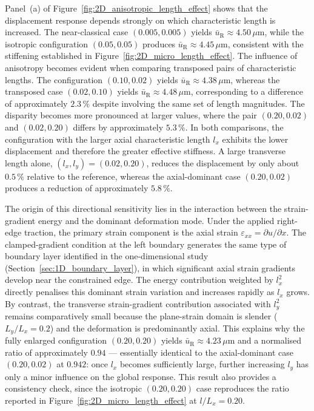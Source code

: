 \documentclass[final,3p,times,fleqn]{elsarticle}
\begin{document}
Panel~(a) of Figure~\ref{fig:2D_anisotropic_length_effect} shows that
the displacement response depends strongly on which characteristic
length is increased.
The near-classical case $(0.005,0.005)$ yields
$\bar{u}_{\mathrm{R}}\approx 4.50\,\mu\mathrm{m}$, while the isotropic
configuration $(0.05,0.05)$ produces
$\bar{u}_{\mathrm{R}}\approx 4.45\,\mu\mathrm{m}$, consistent with the
stiffening established in
Figure~\ref{fig:2D_micro_length_effect}.
The influence of anisotropy becomes evident when comparing transposed
pairs of characteristic lengths.
The configuration $(0.10,0.02)$ yields
$\bar{u}_{\mathrm{R}}\approx 4.38\,\mu\mathrm{m}$, whereas the
transposed case $(0.02,0.10)$ yields
$\bar{u}_{\mathrm{R}}\approx 4.48\,\mu\mathrm{m}$, corresponding to a
difference of approximately $2.3\,\%$ despite involving the same set
of length magnitudes.
The disparity becomes more pronounced at larger values, where the
pair $(0.20,0.02)$ and $(0.02,0.20)$ differs by approximately
$5.3\,\%$.
In both comparisons, the configuration with the larger axial
characteristic length $l_{x}$ exhibits the lower displacement and
therefore the greater effective stiffness.
A large transverse length alone, $(l_{x},l_{y})=(0.02,0.20)$, reduces
the displacement by only about $0.5\,\%$ relative to the reference,
whereas the axial-dominant case $(0.20,0.02)$ produces a reduction of
approximately $5.8\,\%$.

The origin of this directional sensitivity lies in the interaction
between the strain-gradient energy and the dominant deformation mode.
Under the applied right-edge traction, the primary strain component is
the axial strain $\varepsilon_{xx}=\partial u/\partial x$.
The clamped-gradient condition at the left boundary generates the same
type of boundary layer identified in the one-dimensional study
(Section~\ref{sec:1D_boundary_layer}), in which significant axial
strain gradients develop near the constrained edge.
The energy contribution weighted by $l_{x}^{2}$ directly penalises this
dominant strain variation and increases rapidly as $l_{x}$ grows.
By contrast, the transverse strain-gradient contribution associated
with $l_{y}^{2}$ remains comparatively small because the plane-strain domain is
slender ($L_{y}/L_{x}=0.2$) and the deformation is predominantly
axial.
This explains why the fully enlarged configuration $(0.20,0.20)$
yields $\bar{u}_{\mathrm{R}}\approx 4.23\,\mu\mathrm{m}$ and a
normalised ratio of approximately $0.94$ --- essentially identical to
the axial-dominant case $(0.20,0.02)$ at $0.942$: once $l_{x}$ becomes
sufficiently large, further increasing $l_{y}$ has only a minor
influence on the global response.
This result also provides a consistency check, since the isotropic
$(0.20,0.20)$ case reproduces the ratio reported in
Figure~\ref{fig:2D_micro_length_effect} at $l/L_{x}=0.20$.
\end{document}
